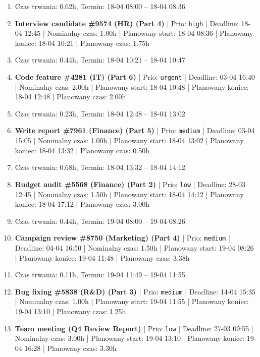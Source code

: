 {\begin{enumerate}
  \item [\textbf{PRZERWA}] Czas trwania: 0.62h, Termin: 18-04 08:00 -- 18-04 08:36
  \item [\textbf{14612}] \textbf{Interview candidate \#9574 (HR) (Part 4)} | Prio: \texttt{high} | Deadline: 18-04 12:45 | Nominalny czas: 1.00h | Planowany start: 18-04 08:36 | Planowany koniec: 18-04 10:21 | Planowany czas: 1.75h
  \item [\textbf{PRZERWA}] Czas trwania: 0.44h, Termin: 18-04 10:21 -- 18-04 10:47
  \item [\textbf{14604}] \textbf{Code feature \#4281 (IT) (Part 6)} | Prio: \texttt{urgent} | Deadline: 03-04 16:40 | Nominalny czas: 2.00h | Planowany start: 18-04 10:48 | Planowany koniec: 18-04 12:48 | Planowany czas: 2.00h
  \item [\textbf{PRZERWA}] Czas trwania: 0.23h, Termin: 18-04 12:48 -- 18-04 13:02
  \item [\textbf{14657}] \textbf{Write report \#7961 (Finance) (Part 5)} | Prio: \texttt{medium} | Deadline: 03-04 15:05 | Nominalny czas: 1.00h | Planowany start: 18-04 13:02 | Planowany koniec: 18-04 13:32 | Planowany czas: 0.50h
  \item [\textbf{PRZERWA}] Czas trwania: 0.68h, Termin: 18-04 13:32 -- 18-04 14:12
  \item [\textbf{14693}] \textbf{Budget audit \#5568 (Finance) (Part 2)} | Prio: \texttt{low} | Deadline: 28-03 12:45 | Nominalny czas: 1.50h | Planowany start: 18-04 14:12 | Planowany koniec: 18-04 17:12 | Planowany czas: 3.00h
  \item [\textbf{PRZERWA}] Czas trwania: 0.44h, Termin: 19-04 08:00 -- 19-04 08:26
  \item [\textbf{14632}] \textbf{Campaign review \#8750 (Marketing) (Part 4)} | Prio: \texttt{medium} | Deadline: 04-04 16:50 | Nominalny czas: 1.50h | Planowany start: 19-04 08:26 | Planowany koniec: 19-04 11:48 | Planowany czas: 3.38h
  \item [\textbf{PRZERWA}] Czas trwania: 0.11h, Termin: 19-04 11:49 -- 19-04 11:55
  \item [\textbf{14637}] \textbf{Bug fixing \#5838 (R\&D) (Part 3)} | Prio: \texttt{medium} | Deadline: 14-04 15:35 | Nominalny czas: 1.00h | Planowany start: 19-04 11:55 | Planowany koniec: 19-04 13:10 | Planowany czas: 1.25h
  \item [\textbf{14682}] \textbf{Team meeting (Q4 Review Report)} | Prio: \texttt{low} | Deadline: 27-03 09:55 | Nominalny czas: 3.00h | Planowany start: 19-04 13:10 | Planowany koniec: 19-04 16:28 | Planowany czas: 3.30h

\end{enumerate}}
